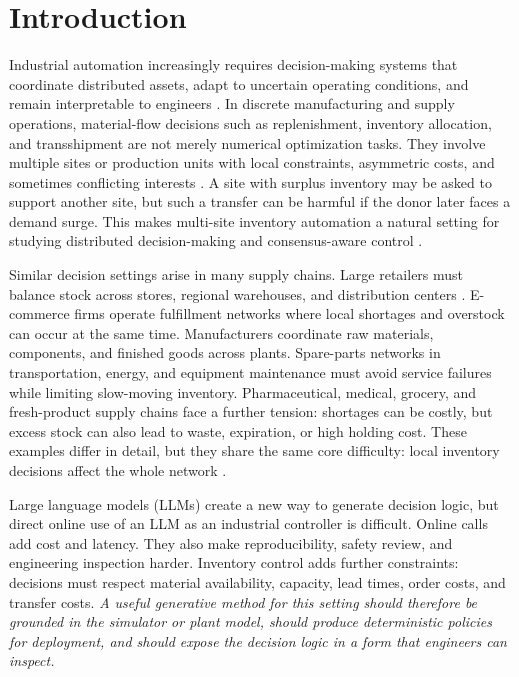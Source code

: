 \documentclass[journal]{IEEEtran}
\begin{document}
\section{Introduction}

Industrial automation increasingly requires decision-making systems that coordinate distributed assets, adapt to uncertain operating conditions, and remain interpretable to engineers \cite{zhang2022advancements}. In discrete manufacturing and supply operations, material-flow decisions such as replenishment, inventory allocation, and transshipment are not merely numerical optimization tasks. They involve multiple sites or production units with local constraints, asymmetric costs, and sometimes conflicting interests \cite{agrawal2008multi}. A site with surplus inventory may be asked to support another site, but such a transfer can be harmful if the donor later faces a demand surge. This makes multi-site inventory automation a natural setting for studying distributed decision-making and consensus-aware control \cite{sampath2022inventory}.

Similar decision settings arise in many supply chains. Large retailers must balance stock across stores, regional warehouses, and distribution centers \cite{vicente2023distribution}. E-commerce firms operate fulfillment networks where local shortages and overstock can occur at the same time. Manufacturers coordinate raw materials, components, and finished goods across plants. Spare-parts networks in transportation, energy, and equipment maintenance must avoid service failures while limiting slow-moving inventory. Pharmaceutical, medical, grocery, and fresh-product supply chains face a further tension: shortages can be costly, but excess stock can also lead to waste, expiration, or high holding cost. These examples differ in detail, but they share the same core difficulty: local inventory decisions affect the whole network \cite{ala2024fuzzy}.

Large language models (LLMs) \cite{chang2024survey} create a new way to generate decision logic, but direct online use of an LLM as an industrial controller is difficult. Online calls add cost and latency. They also make reproducibility, safety review, and engineering inspection harder. Inventory control adds further constraints: decisions must respect material availability, capacity, lead times, order costs, and transfer costs. \emph{A useful generative method for this setting should therefore be grounded in the simulator or plant model, should produce deterministic policies for deployment, and should expose the decision logic in a form that engineers can inspect.}
\end{document}
